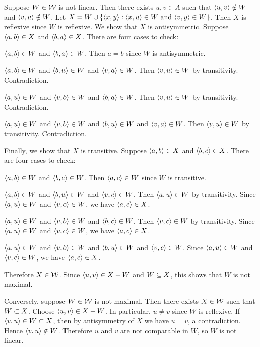 \begin{solution}
\begin{enumalpha}
    \item Suppose $W\in\mathcal{W}$ is not linear.
    Then there exists $u,v\in A$ such that $\left\langle u,v\right\rangle\notin W$ and $\left\langle v,u\right\rangle\notin W$.
    Let $X=W\cup\setb{\aprn{x,y}}{\aprn{x,u}\in W\land \aprn{v,y} \in W}$. Then $X$ is reflexive
    since $W$ is reflexive. We show that $X$ is antisymmetric.
    Suppose $\left\langle a,b\right\rangle\in X$ and $\left\langle b,a\right\rangle\in X$.
    There are four cases to check:
    \begin{enumroman}
        \item $\left\langle a,b\right\rangle\in W$ and $\left\langle b,a\right\rangle\in W$. Then $a=b$ since $W$ is antisymmetric.
        \item $\left\langle a,b\right\rangle\in W$ and $\left\langle b,u\right\rangle\in W$ and $\left\langle v,a\right\rangle\in W$. Then $\left\langle v,u\right\rangle\in W$ by transitivity.
        Contradiction.
        \item $\left\langle a,u\right\rangle\in W$ and $\left\langle v,b\right\rangle\in W$ and $\left\langle b,a\right\rangle\in W$. Then $\left\langle v,u\right\rangle\in W$ by transitivity.
        Contradiction.
        \item $\left\langle a,u\right\rangle\in W$ and $\left\langle v,b\right\rangle\in W$ and $\left\langle b,u\right\rangle\in W$ and $\left\langle v,a\right\rangle\in W$.
        Then $\left\langle v,u\right\rangle\in W$ by transitivity. Contradiction.
    \end{enumroman}
    Finally, we show that $X$ is transitive.
    Suppose $\left\langle a,b\right\rangle\in X$ and $\left\langle b,c\right\rangle\in X$.
    There are four cases to check:
    \begin{enumroman}
        \item $\left\langle a,b\right\rangle\in W$ and $\left\langle b,c\right\rangle\in W$. Then $\left\langle a,c\right\rangle\in W$ since $W$ is transitive.
        \item $\left\langle a,b\right\rangle\in W$ and $\left\langle b,u\right\rangle\in W$ and $\left\langle v,c\right\rangle\in W$. Then $\left\langle a,u\right\rangle\in W$ by transitivity.
        Since $\left\langle a,u\right\rangle\in W$ and $\left\langle v,c\right\rangle\in W$, we have $\left\langle a,c\right\rangle\in X$.
        \item $\left\langle a,u\right\rangle\in W$ and $\left\langle v,b\right\rangle\in W$ and $\left\langle b,c\right\rangle\in W$. Then $\left\langle v,c\right\rangle\in W$ by transitivity.
        Since $\left\langle a,u\right\rangle\in W$ and $\left\langle v,c\right\rangle\in W$, we have $\left\langle a,c\right\rangle\in X$.
        \item $\left\langle a,u\right\rangle\in W$ and $\left\langle v,b\right\rangle\in W$ and $\left\langle b,u\right\rangle\in W$ and $\left\langle v,c\right\rangle\in W$.
        Since $\left\langle a,u\right\rangle\in W$ and $\left\langle v,c\right\rangle\in W$, we have $\left\langle a,c\right\rangle\in X$.
    \end{enumroman}
    Therefore $X\in\mathcal{W}$. Since $\left\langle u,v\right\rangle\in X-W$ and $W\subseteq X$, this shows that $W$ is not maximal.

    Conversely, suppose $W\in \mathcal{W}$ is not maximal. Then there exists $X\in\mathcal{W}$ such that $W\subset X$.
    Choose $\left\langle u,v\right\rangle\in X-W$. In particular, $u\neq v$ since $W$ is reflexive.
    If $\left\langle v,u\right\rangle\in W\subset X$, then by antisymmetry of $X$ we have $u=v$, a contradiction.
    Hence $\left\langle v,u\right\rangle\notin W$. Therefore $u$ and $v$ are not comparable in $W$, so $W$ is not linear.


\end{enumalpha}
\end{solution}
